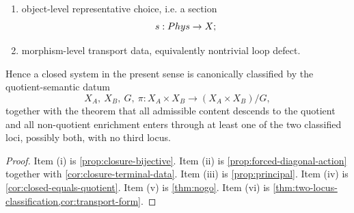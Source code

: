 \begin{theorem}
\begin{enumerate}[label=\textup{(\roman*)}]
\begin{enumerate}[label=\textup{(\alph*)}]
			      \item object-level representative choice, i.e. a section
			            \[
				            s:Phys\to X;
			            \]
			      \item morphism-level transport data, equivalently nontrivial loop defect.
		      \end{enumerate}
		\end{enumerate}
		Hence a closed system in the present sense is canonically classified by
		the quotient-semantic datum
		\[
			X_A,\ X_B,\ G,\ \pi:X_A\times X_B\to (X_A\times X_B)/G,
		\]
		together with the theorem that all admissible content descends to the
		quotient and all non-quotient enrichment enters through at least one of
		the two classified loci, possibly both, with no third locus.
\end{theorem}
\begin{proof}
	Item \textup{(i)} is \cref{prop:closure-bijective}. Item \textup{(ii)}
	is \cref{prop:forced-diagonal-action} together with
	\cref{cor:closure-terminal-data}. Item \textup{(iii)} is
	\cref{prop:principal}. Item \textup{(iv)} is
	\cref{cor:closed-equals-quotient}. Item \textup{(v)} is
	\cref{thm:nogo}. Item \textup{(vi)} is
	\cref{thm:two-locus-classification,cor:transport-form}.
\end{proof}
